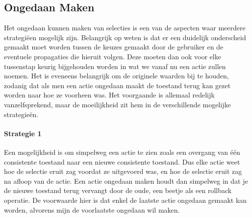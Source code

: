 \subsection{Ongedaan Maken}
Het ongedaan kunnen maken van selecties is een van de aspecten waar meerdere strategi\"{e}en mogelijk zijn. Belangrijk op weten is dat er een duidelijk onderscheid gemaakt moet worden tussen de keuzes gemaakt door de gebruiker en de eventuele propagaties die hieruit volgen. Deze moeten dan ook voor elke tussenstap keurig bijgehouden worden in wat we vanaf nu een actie zullen noemen. Het is eveneens belangrijk om de originele waarden bij te houden, zodanig dat als men een actie ongedaan maakt de toestand terug kan gezet worden naar hoe ze voorheen was. Het voorgaande is allemaal redelijk vanzelfsprekend, maar de moeilijkheid zit hem in de verschillende mogelijke strategie\"{e}n. 

\paragraph{Strategie 1}
Een mogelijkheid is om simpelweg een actie te zien zoals een overgang van \'{e}\'{e}n consistente toestand naar een nieuwe consistente toestand. Dus elke actie weet hoe de selectie eruit zag voordat ze uitgevoerd was, en hoe de selectie eruit zag na afloop van de actie. Een actie ongedaan maken houdt dan simpelweg in dat je de nieuwe toestand terug vervangt door de oude, een beetje als een rollback operatie. De voorwaarde hier is dat enkel de laatste actie ongedaan gemaakt kan worden, alvorens mijn de voorlaatste ongedaan wil maken. 

